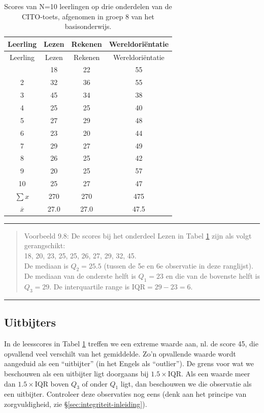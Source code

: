 \documentclass[
]{book}
\begin{document}
\begin{longtable}[]{@{}cccc@{}}
\caption{\label{tab:cito} Scores van N=10 leerlingen op drie onderdelen van de CITO-toets,
afgenomen in groep 8 van het basisonderwijs.}\tabularnewline
\toprule\noalign{}
Leerling & Lezen & Rekenen & Wereldoriëntatie \\
\midrule\noalign{}
\endfirsthead
\toprule\noalign{}
Leerling & Lezen & Rekenen & Wereldoriëntatie \\
\midrule\noalign{}
\endhead
\bottomrule\noalign{}
\endlastfoot
1 & 18 & 22 & 55 \\
2 & 32 & 36 & 55 \\
3 & 45 & 34 & 38 \\
4 & 25 & 25 & 40 \\
5 & 27 & 29 & 48 \\
6 & 23 & 20 & 44 \\
7 & 29 & 27 & 49 \\
8 & 26 & 25 & 42 \\
9 & 20 & 25 & 57 \\
10 & 25 & 27 & 47 \\
\(\sum x\) & 270 & 270 & 475 \\
\(\overline{x}\) & 27.0 & 27.0 & 47.5 \\
\end{longtable}

\begin{center}\rule{0.5\linewidth}{0.5pt}\end{center}

\begin{quote}
Voorbeeld 9.8:
De scores bij het onderdeel Lezen in
Tabel \ref{tab:cito} zijn
als volgt gerangschikt:\\
18, 20, 23, 25, 25, 26, 27, 29, 32, 45.\\
De mediaan is \(Q_2=25.5\) (tussen de 5e en 6e observatie in deze
ranglijst). De mediaan van de onderste helft is \(Q_1=23\) en die van de
bovenste helft is \(Q_3=29\). De interquartile range is
\(\textrm{IQR}=29-23=6\).
\end{quote}

\begin{center}\rule{0.5\linewidth}{0.5pt}\end{center}

\subsection{Uitbijters}\label{sec:uitbijters}

In de leesscores in Tabel \ref{tab:cito} treffen we een extreme waarde aan, nl. de score
45, die opvallend veel verschilt van het gemiddelde. Zo'n opvallende
waarde wordt aangeduid als een ``uitbijter'' (in het Engels als
``outlier''). De grens voor wat we beschouwen als een uitbijter ligt
doorgaans bij \(1.5 \times \textrm{IQR}\). Als een waarde meer dan
\(1.5 \times \textrm{IQR}\) boven \(Q_3\) of onder \(Q_1\) ligt, dan
beschouwen we die observatie als een uitbijter. Controleer deze
observaties nog eens (denk aan het principe van zorgvuldigheid, zie
§\ref{sec:integriteit-inleiding}).
\end{document}

